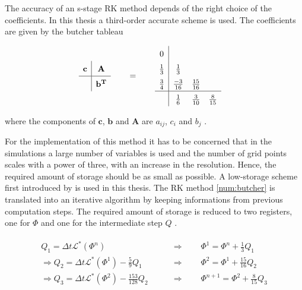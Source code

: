 The accuracy of an s-stage RK method depends of the right choice of the coefficients.
In this thesis a third-order accurate scheme is used.
The coefficients are given by the butcher tableau

\begin{align}
    \label{num:butcher}
    \def\arraystretch{1.5}%
    \begin{array}{c|c}
        \mathbf{c} & \mathbf{A}\\
        \hline     & \mathbf{b^T} \\
    \end{array}
    \qquad &= \qquad
    \def\arraystretch{1.5}%
    \begin{array}{c|ccc}
            0 \\
                    \frac{1}{3} & \frac{1}{3} \\
            \frac{3}{4} & \frac{-3}{16} & \frac{15}{16} \\
            \hline & \frac{1}{6} & \frac{3}{10} & \frac{8}{15}
    \end{array}
\end{align}

where the components of $\mathbf{c}$, $\mathbf{b}$ and $\mathbf{A}$ are $a_{ij}$, $c_i$ and $b_j$ \citep{umwelt}.

For the implementation of this method it has to be concerned that in the simulations a large number of variables is used
and the number of grid points scales with a power of three, with an increase in the resolution.
Hence, the required amount of storage should be as small as possible.
A low-storage scheme first introduced by \citep{Williamson1980} is used in this thesis.
The RK method \ref{num:butcher} is translated into an iterative algorithm by keeping informations from previous computation steps.
The required amount of storage is reduced to two registers, one for $\Phi$ and one for the intermediate step $Q$  \citep{umwelt}.

\begin{align}
    \begin{split}
    Q_1 = \Delta t \mathcal{L}^*\left(\Phi^n\right)\qquad &\Rightarrow \qquad \Phi^{1} = \Phi^n + \frac{1}{3}Q_1 \\
    \Rightarrow Q_2 = \Delta t \mathcal{L}^*\left(\Phi^1\right) - \frac{5}{9} Q_1 \qquad &\Rightarrow \qquad \Phi^{2} = \Phi^1 + \frac{15}{16}Q_2 \\
   \Rightarrow  Q_3 = \Delta t \mathcal{L}^*\left(\Phi^2\right) - \frac{153}{128} Q_2 \qquad &\Rightarrow \qquad \Phi^{n+1} = \Phi^2 + \frac{8}{15}Q_3 \\
    \end{split}
\end{align}


